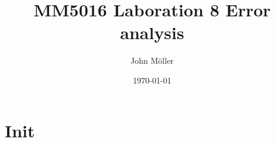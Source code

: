 \documentclass[10pt]{article}
\author{John Möller}
\date{\today}
\title{MM5016 Laboration 8 Error analysis}
\begin{document}
\maketitle

\section{Init}
\label{sec:org57aca46}
\end{document}
